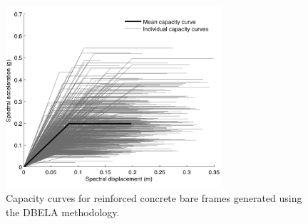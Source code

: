 \begin{figure}[htb]
  \centering
      \includegraphics[width=8cm]{figures/synthethic_capacity_curves.png}
  \caption{Capacity curves for reinforced concrete bare frames generated using the DBELA methodology.}
  \label{fig:DBELA_cc}
\end{figure}